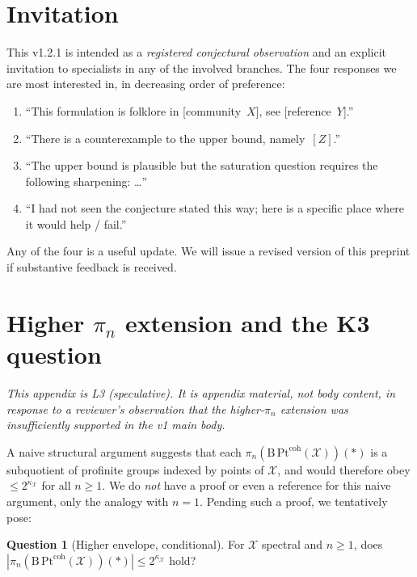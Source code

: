 \documentclass[11pt]{article}
\theoremstyle{definition}
\newtheorem*{question}{Question}
\theoremstyle{plain}
\theoremstyle{remark}
\newcommand{\Pt}{\mathrm{Pt}}
\newcommand{\Bcat}{\mathrm{B}}
\begin{document}
\section{Invitation}

This v1.2.1 is intended as a \emph{registered conjectural observation} and an
explicit invitation to specialists in any of the involved branches. The four
responses we are most interested in, in decreasing order of preference:

\begin{enumerate}
\item ``This formulation is folklore in [community~$X$], see [reference~$Y$].''
\item ``There is a counterexample to the upper bound,
  namely~$[Z]$.''
\item ``The upper bound is plausible but the saturation question requires the
  following sharpening: \ldots''
\item ``I had not seen the conjecture stated this way; here is a specific
  place where it would help / fail.''
\end{enumerate}

Any of the four is a useful update. We will issue a revised version of this preprint if
substantive feedback is received.

\appendix

\section{Higher \texorpdfstring{$\pi_n$}{pi-n} extension and the K3 question}\label{app:higher}

\emph{This appendix is L3 (speculative). It is appendix material, not body
content, in response to a reviewer's observation that the higher-$\pi_n$
extension was insufficiently supported in the v1 main body.}

A naive structural argument suggests that each
$\pi_n(\Bcat\,\Pt^{\mathrm{coh}}(\mathcal X))(\ast)$ is a subquotient of
profinite groups indexed by points of $\mathcal X$, and would therefore obey
$\le 2^{\kappa_{\mathcal X}}$ for all $n \ge 1$. We do \emph{not} have a proof
or even a reference for this naive argument, only the analogy with $n = 1$.
Pending such a proof, we tentatively pose:

\begin{question}[Higher envelope, conditional]\label{q:higher}
For $\mathcal X$ spectral and $n \ge 1$, does
$| \pi_n(\Bcat\,\Pt^{\mathrm{coh}}(\mathcal X))(\ast) | \le 2^{\kappa_{\mathcal X}}$
hold?
\end{question}
\end{document}
